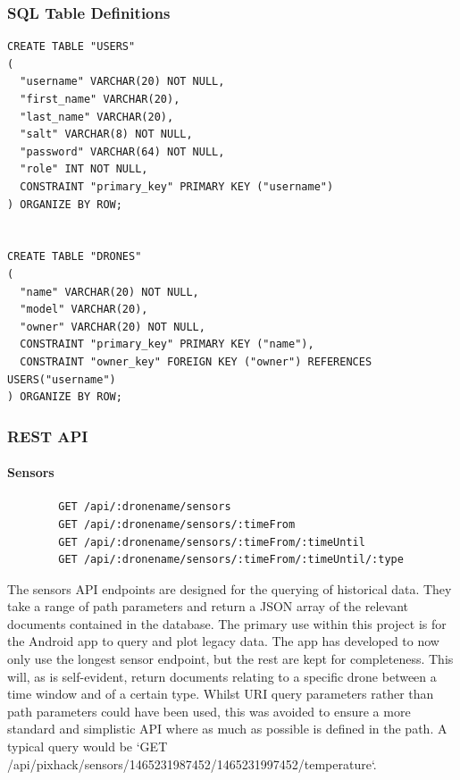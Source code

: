 \documentclass{article}
\begin{document}
\subsubsection{SQL Table Definitions} \label{SQLDefinitions}
\begin{center}
\begin{lstlisting} 
CREATE TABLE "USERS"
(
  "username" VARCHAR(20) NOT NULL,
  "first_name" VARCHAR(20),
  "last_name" VARCHAR(20),
  "salt" VARCHAR(8) NOT NULL,
  "password" VARCHAR(64) NOT NULL,
  "role" INT NOT NULL,
  CONSTRAINT "primary_key" PRIMARY KEY ("username")
) ORGANIZE BY ROW;


CREATE TABLE "DRONES"
(
  "name" VARCHAR(20) NOT NULL,
  "model" VARCHAR(20),
  "owner" VARCHAR(20) NOT NULL,
  CONSTRAINT "primary_key" PRIMARY KEY ("name"),
  CONSTRAINT "owner_key" FOREIGN KEY ("owner") REFERENCES USERS("username")
) ORGANIZE BY ROW;
\end{lstlisting}
\end{center}

\subsubsection{REST API} \label{apdxRestApi}
\paragraph{Sensors}
\begin{center}
	\begin{lstlisting}
		GET /api/:dronename/sensors
		GET /api/:dronename/sensors/:timeFrom
		GET /api/:dronename/sensors/:timeFrom/:timeUntil
		GET /api/:dronename/sensors/:timeFrom/:timeUntil/:type
	\end{lstlisting}
\end{center}
The sensors API endpoints are designed for the querying of historical data. They take a range of path parameters and return a JSON array of the relevant documents contained in the database. The primary use within this project is for the Android app to query and plot legacy data. The app has developed to now only use the longest sensor endpoint, but the rest are kept for completeness. This will, as is self-evident, return documents relating to a specific drone between a time window and of a certain type. Whilst URI query parameters rather than path parameters could have been used, this was avoided to ensure a more standard and simplistic API where as much as possible is defined in the path. A typical query would be `GET /api/pixhack/sensors/1465231987452/1465231997452/temperature`.
\end{document}

